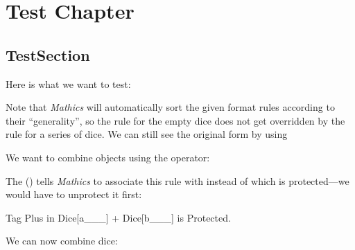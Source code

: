 

\chapter{Test Chapter}
\chapterstart
\chaptersections
\section*{TestSection}
\sectionstart

Here is what we want to test:

Note that \emph{Mathics} will automatically sort the given format rules according to their ``generality'', so the rule for the empty dice does not get overridden by the rule for a series of dice.
We can still see the original form by using 
\begin{tests}%
\begin{testcase}
\begin{testresult}\end{testresult}\end{testcase}%
\end{tests}
We want to combine  objects using the  operator:
\begin{tests}%
\begin{testcase}
\end{testcase}%
\end{tests}
The  () tells \emph{Mathics} to associate this rule with  instead of  which is protected---we would have to unprotect it first:
\begin{tests}%
\begin{testcase}
\begin{testmessage}Tag Plus in Dice[a\_\_\_] + Dice[b\_\_\_] is Protected.\end{testmessage}\begin{testresult}\end{testresult}\end{testcase}%
\end{tests}
We can now combine dice:
\sectionend
\chapterend
